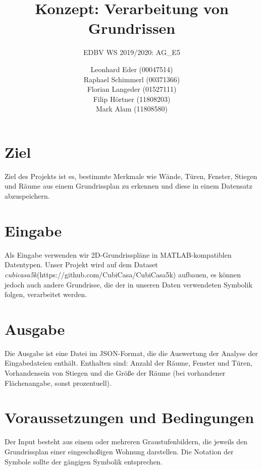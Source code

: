 \documentclass[deutsch]{scrartcl}
\begin{document}
\title{Konzept: Verarbeitung von Grundrissen} %

\subtitle{EDBV WS 2019/2020: AG\_E5} %


\author{Leonhard Eder (00047514)\\
Raphael Schimmerl (00371366)\\
Florian Langeder (01527111)\\
Filip Hörtner (11808203)\\
Mark Alam (11808580)}


\maketitle



\section{Ziel}
Ziel des Projekts ist es, bestimmte Merkmale wie Wände, Türen, Fenster, Stiegen und Räume aus einem Grundrissplan zu erkennen und diese in einem Datensatz abzuspeichern.
\section{Eingabe}
Als Eingabe verwenden wir 2D-Grundrisspläne in MATLAB-kompatiblen Datentypen. Unser Projekt wird auf dem Dataset \textit{cubicasa5k}(https://github.com/CubiCasa/CubiCasa5k) aufbauen, es können jedoch auch andere Grundrisse, die der in unseren Daten verwendeten Symbolik folgen, verarbeitet werden.
\section{Ausgabe}
Die Ausgabe ist eine Datei im JSON-Format, die die Auswertung der Analyse der Eingabedateien enthält. Enthalten sind: Anzahl der Räume, Fenster und Türen, Vorhandensein von Stiegen und die Größe der Räume (bei vorhandener Flächenangabe, sonst prozentuell).
\section{Voraussetzungen und Bedingungen}
Der Input besteht aus einem oder mehreren Graustufenbildern, die jeweils den Grundrissplan einer eingeschoßigen Wohnung darstellen. Die Notation der Symbole sollte der gängigen Symbolik entsprechen.
\end{document}
